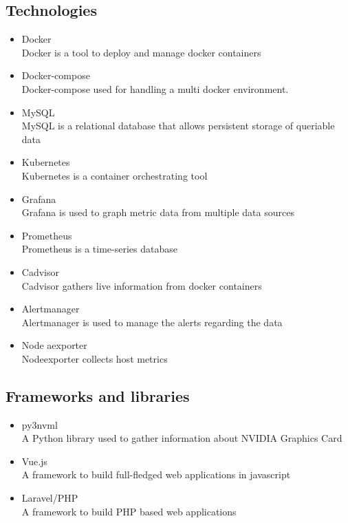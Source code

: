\documentclass[../main.tex]{subfiles}
\begin{document}
\newpage
\subsection{Technologies}
\begin{itemize}
    \item Docker \cite{docker}\\ Docker is a tool to deploy and manage docker containers 
    \item Docker-compose \cite{dockercomp}\\ Docker-compose used for handling a multi docker environment.
    \item MySQL \cite{mysql}\\ MySQL is a relational database that allows persistent storage of queriable data
    \item Kubernetes \cite{kube}\\ Kubernetes is a container orchestrating tool
    \item Grafana \cite{grafana}\\Grafana is used to graph metric data from multiple data sources
    \item Prometheus \cite{prometheus}\\Prometheus is a time-series database
    \item Cadvisor \cite{cadvisor}\\Cadvisor gathers live information from docker containers
    \item Alertmanager \cite{alertmanager}\\Alertmanager is used to manage the alerts regarding the data
    \item Node aexporter \cite{nodeexporter}\\Nodeexporter collects host metrics
\end{itemize}

\newpage
\subsection{Frameworks and libraries}
\begin{itemize}
    \item py3nvml \cite{py3nvml}\\ A Python library used to gather information about NVIDIA Graphics Card
    \item Vue.js \cite{vuejs}\\ A framework to build full-fledged web applications in javascript
    \item Laravel/PHP \cite{laravel}\\ A framework to build PHP based web applications
\end{itemize}
\end{document}
